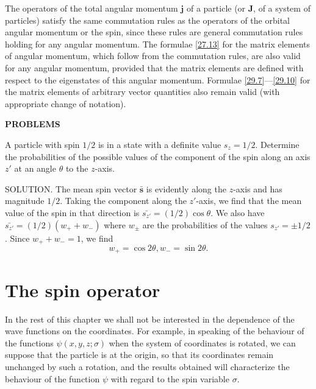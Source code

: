 The operators of the total angular momentum $ \bm{j} $ of a particle (or $ \bm{J} $, of a system of particles) satisfy the same commutation rules as the operators of the orbital angular momentum or the spin, since these rules are general commutation rules holding for any angular momentum. The formulae \eqref{27.13} for the matrix elements of angular momentum, which follow from the commutation rules, are also valid for any angular momentum, provided that the matrix elements are defined with respect to the eigenstates of this angular momentum. Formulae \eqref{29.7}—\eqref{29.10} for the matrix elements of arbitrary vector quantities also remain valid (with appropriate change of notation).





{\small
	
\textbf{PROBLEMS}


A particle with spin $ 1/2 $ is in a state with a definite value $ s_z = 1/2 $. Determine the probabilities of the possible values of the component of the spin along an axis $ z' $ at an angle $\theta$ to the $ z $-axis.





SOLUTION. The mean spin vector $ \bar{\bm{s}} $ is evidently along the $ z $-axis and has magnitude $ 1/2 $. Taking the component along the $ z' $-axis, we find that the mean value of the spin in that direction is $ \bar{s_{z'}}=(1/2)\cos\theta $. We also have $ \bar{s_{z'}}=(1/2)(w_++w_-) $ where $ w_\pm $ are the probabilities of the values $ s_{z'} = \pm1/2 $. Since $ w_++w_-= 1 $, we find 
\[ w_+ = \cos2\theta, w_- = \sin2\theta. \] }





\section{The spin operator}\label{The spin operator}
In the rest of this chapter we shall not be interested in the dependence of the wave functions on the coordinates. For example, in speaking of the behaviour of the functions $ \psi(x, y, z; \sigma) $ when the system of coordinates is rotated, we can suppose that the particle is at the origin, so that its coordinates remain unchanged by such a rotation, and the results obtained will characterize the behaviour of the function $ \psi $ with regard to the spin variable $ \sigma $.

